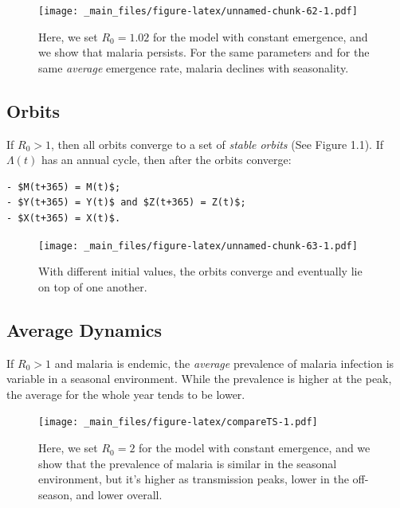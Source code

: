 \documentclass[
]{book}
\begin{document}
\begin{figure}
\centering
\texttt{[image: \_main\_files/figure-latex/unnamed-chunk-62-1.pdf]}
\caption{\label{fig:unnamed-chunk-62}Here, we set \(R_0= 1.02\) for the model with constant emergence, and we show that malaria persists. For the same parameters and for the same \emph{average} emergence rate, malaria declines with seasonality.}
\end{figure}

\clearpage

\subsection{Orbits}\label{orbits}

If \(R_0 >1\), then all orbits converge to a set of \emph{stable orbits} (See Figure 1.1). If \(\Lambda(t)\) has an annual cycle, then after the orbits converge:

\begin{verbatim}
- $M(t+365) = M(t)$; 
- $Y(t+365) = Y(t)$ and $Z(t+365) = Z(t)$; 
- $X(t+365) = X(t)$. 
\end{verbatim}

\begin{figure}
\centering
\texttt{[image: \_main\_files/figure-latex/unnamed-chunk-63-1.pdf]}
\caption{\label{fig:unnamed-chunk-63}With different initial values, the orbits converge and eventually lie on top of one another.}
\end{figure}

\clearpage

\subsection{Average Dynamics}\label{average-dynamics}

If \(R_0>1\) and malaria is endemic, the \emph{average} prevalence of malaria infection is variable in a seasonal environment. While the prevalence is higher at the peak, the average for the whole year tends to be lower.

\begin{figure}
\centering
\texttt{[image: \_main\_files/figure-latex/compareTS-1.pdf]}
\caption{\label{fig:compareTS}Here, we set \(R_0= 2\) for the model with constant emergence, and we show that the prevalence of malaria is similar in the seasonal environment, but it's higher as transmission peaks, lower in the off-season, and lower overall.}
\end{figure}
\end{document}
